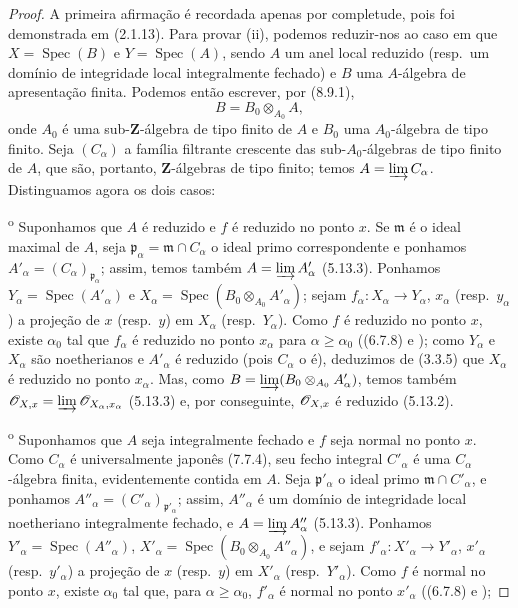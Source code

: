\begin{proof}
A primeira afirmação é recordada apenas
por completude, pois foi demonstrada em
(2.1.13). Para provar (ii), podemos
reduzir-nos ao caso em que
$X=\operatorname{Spec}(B)$ e
$Y=\operatorname{Spec}(A)$, sendo $A$
um anel local reduzido (resp.\ um domínio de
integridade local integralmente fechado) e $B$ uma
$A$-álgebra de apresentação finita.
Podemos então escrever, por (8.9.1),
\[
B=B_0\otimes_{A_0}A,
\]
onde $A_0$ é uma sub-$\mathbf Z$-álgebra
de tipo finito de $A$ e $B_0$ uma
$A_0$-álgebra de tipo finito. Seja
$(C_\alpha)$ a família filtrante
crescente das sub-$A_0$-álgebras de
tipo finito de $A$, que são, portanto,
$\mathbf Z$-álgebras de tipo finito;
temos $A=\varinjlim C_\alpha$.
Distinguamos agora os dois casos:

\textsuperscript{o} Suponhamos
que $A$ é reduzido e $f$ é reduzido
no ponto $x$. Se $\mathfrak m$ é o
ideal maximal de $A$, seja
$\mathfrak p_\alpha=\mathfrak m\cap
C_\alpha$ o ideal primo correspondente
e ponhamos
$A'_\alpha=(C_\alpha)_{\mathfrak p_\alpha}$;
assim, temos também
$A=\varinjlim A'_\alpha$ (5.13.3).
Ponhamos
$Y_\alpha=\operatorname{Spec}(A'_\alpha)$
e
$X_\alpha=\operatorname{Spec}
(B_0\otimes_{A_0}A'_\alpha)$;
sejam $f_\alpha:X_\alpha\to Y_\alpha$,
$x_\alpha$ (resp.\ $y_\alpha$) a
projeção de $x$ (resp.\ $y$) em
$X_\alpha$ (resp.\ $Y_\alpha$).
Como $f$ é reduzido no ponto $x$,
existe $\alpha_0$ tal que $f_\alpha$
é reduzido no ponto $x_\alpha$ para
$\alpha\geq\alpha_0$
((6.7.8) e );
como $Y_\alpha$ e $X_\alpha$ são
noetherianos e $A'_\alpha$ é
reduzido (pois $C_\alpha$ o é),
deduzimos de (3.3.5) que $X_\alpha$
é reduzido no ponto $x_\alpha$.
Mas, como
$B=\varinjlim
(B_0\otimes_{A_0}A'_\alpha)$,
temos também
$\mathscr{O}_{X,x}=\varinjlim
\mathscr{O}_{X_\alpha,x_\alpha}$ (5.13.3)
e, por conseguinte,
$\mathscr{O}_{X,x}$ é reduzido (5.13.2).

\textsuperscript{o} Suponhamos
que $A$ seja integralmente fechado
e $f$ seja normal no ponto $x$.
Como $C_\alpha$ é universalmente
japonês (7.7.4), seu fecho integral
$C'_\alpha$ é uma $C_\alpha$-álgebra
finita, evidentemente contida em $A$.
Seja $\mathfrak p'_\alpha$ o ideal primo
$\mathfrak m\cap C'_\alpha$, e ponhamos
$A''_\alpha=(C'_\alpha)_{\mathfrak p'_\alpha}$;
assim, $A''_\alpha$ é um domínio de integridade
local noetheriano integralmente
fechado, e $A=\varinjlim A''_\alpha$
(5.13.3). Ponhamos
$Y'_\alpha=\operatorname{Spec}(A''_\alpha)$,
$X'_\alpha=\operatorname{Spec}
(B_0\otimes_{A_0}A''_\alpha)$, e sejam
$f'_\alpha:X'_\alpha\to Y'_\alpha$,
$x'_\alpha$ (resp.\ $y'_\alpha$) a
projeção de $x$ (resp.\ $y$) em
$X'_\alpha$ (resp.\ $Y'_\alpha$).
Como $f$ é normal no ponto $x$,
existe $\alpha_0$ tal que, para
$\alpha\geq\alpha_0$, $f'_\alpha$
é normal no ponto $x'_\alpha$
((6.7.8) e );


\end{proof}
